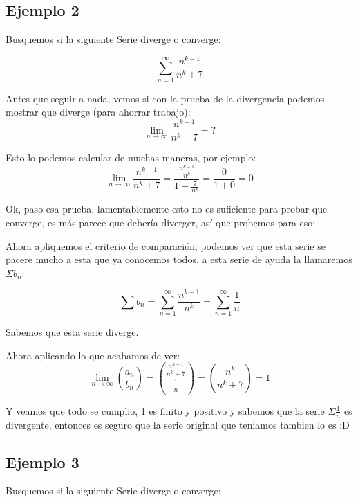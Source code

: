 \documentclass[12pt]{article}							    %
\begin{document}
\subsection{Ejemplo 2}
Busquemos si la siguiente Serie diverge o converge:

\begin{equation*}
    \sum_{n=1}^{\infty} \frac{n^{k-1}}{n^k+7}
\end{equation*}
 
Antes que seguir a nada, vemos si con la prueba de la divergencia podemos mostrar que diverge (para ahorrar trabajo):
\begin{equation*}
    \lim_{n \to \infty} \frac{n^{k-1}}{n^k+7} = ?
\end{equation*}

Esto lo podemos calcular de muchas maneras, por ejemplo:
\begin{equation*}
    \lim_{n \to \infty} \frac{n^{k-1}}{n^k+7} = \frac{ \frac{n^{k-1}}{n^k} }{1+\frac{7}{n^k}} = \frac{0}{1+0} = 0
\end{equation*}

Ok, paso esa prueba, lamentablemente esto no es suficiente para probar que converge, es más parece que debería diverger, así que probemos para eso:

Ahora apliquemos el criterio de comparación, podemos ver que esta serie se pacere mucho a esta que ya conocemos todos, a esta serie de ayuda la llamaremos $\Sigma b_n$:

\begin{equation*}
    \sum b_n = \sum_{n=1}^{\infty} \frac{n^{k-1}}{n^k} = \sum_{n=1}^{\infty} \frac{1}{n}
\end{equation*}

Sabemos que esta serie diverge.

Ahora aplicando lo que acabamos de ver:
\begin{equation*}
    \lim_{n \to \infty} \left( \frac{a_n}{b_n} \right) = \left( \frac{ \frac{n^{k-1}}{n^k+7} }{ \frac{1}{n} } \right) =  \left( \frac{n^k}{n^k+7} \right) = 1
\end{equation*}

Y veamos que todo se cumplio, 1 es finito y positivo y sabemos que la serie $\Sigma \frac{1}{n}$ es divergente, entonces es seguro que la serie original que teniamos tambien lo es :D


\subsection{Ejemplo 3}
Busquemos si la siguiente Serie diverge o converge:
\end{document}

